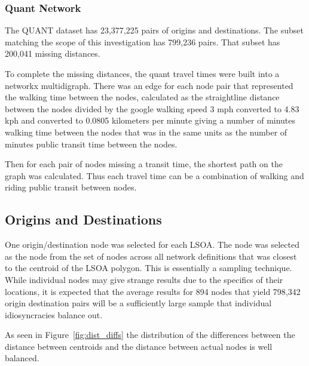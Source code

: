 
 
\subsubsection{Quant Network}

The QUANT dataset has 23,377,225 pairs of origins and destinations. The subset matching the scope of this investigation has 799,236 pairs. That subset has 200,041 missing distances. 

To complete the missing distances, the quant travel times were built into a networkx multidigraph. There was an edge for each node pair that represented the walking time between the nodes, calculated as the straightline distance between the nodes divided by the google walking speed 3 mph converted to 4.83 kph and converted to  0.0805 kilometers per minute giving a number of minutes walking time between the nodes that was in the same units as the number of minutes public transit time between the nodes. 

Then for each pair of nodes missing a transit time, the shortest path on the graph was calculated. Thus each travel time can be a combination of walking and riding public transit between nodes. 

\subsection{Origins and Destinations}

One origin/destination node was selected for each LSOA. The node was selected as the node from the set of nodes across all network definitions that was closest to the centroid of the LSOA polygon. This is essentially a sampling technique. While individual nodes may give strange results due to the specifics of their locations, it is expected that the average results for 894 nodes that yield 798,342 origin destination pairs will be a sufficiently large sample that individual idiosyncracies balance out. 

As seen in Figure~\ref{fig:dist_diffs} the distribution of the differences between the distance between centroids and the distance between actual nodes is well balanced. 

